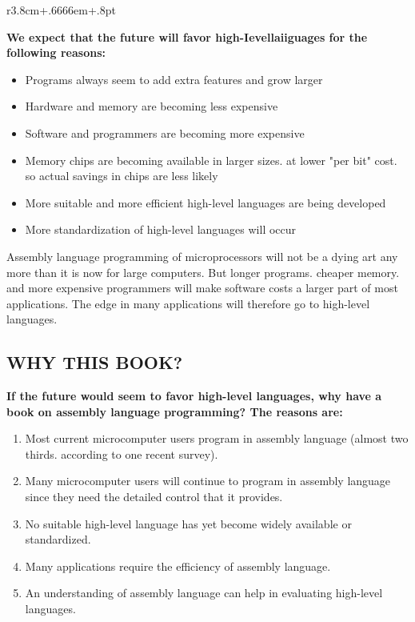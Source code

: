 \documentclass{book}
\begin{document}
\begin{wrapfigure}{r}{3.8cm+.6666em+.8pt}
\end{wrapfigure}
\textbf{We expect that the future will favor high-Ievellaiiguages for the following reasons:}
\begin{itemize}
\item{Programs always seem to add extra features and grow larger}
\item{Hardware and memory are becoming less expensive}
\item{Software and programmers are becoming more expensive}
\item{Memory chips are becoming available in larger sizes. at lower "per bit" cost. so actual savings in chips are less likely}
\item{More suitable and more efficient high-level languages are being developed}
\item{More standardization of high-level languages will occur}
\end{itemize}

Assembly language programming of microprocessors will not be a dying art any more than it is now for large computers. But longer programs. cheaper memory. and more expensive programmers will make software costs a larger part of most applications. The edge in many applications will therefore go to high-level languages.

\subsection*{WHY THIS BOOK?}
\textbf{If the future would seem to favor high-level languages, why have a book on assembly language programming? The reasons are:}
\begin{enumerate}
\item{Most current microcomputer users program in assembly language (almost two thirds. according to one recent survey).}
\item{Many microcomputer users will continue to program in assembly language since they need the detailed control that it provides.}
\item{No suitable high-level language has yet become widely available or standardized.}
\item{Many applications require the efficiency of assembly language.}
\item{An understanding of assembly language can help in evaluating high-level
languages.}
\end{enumerate}
\end{document}
